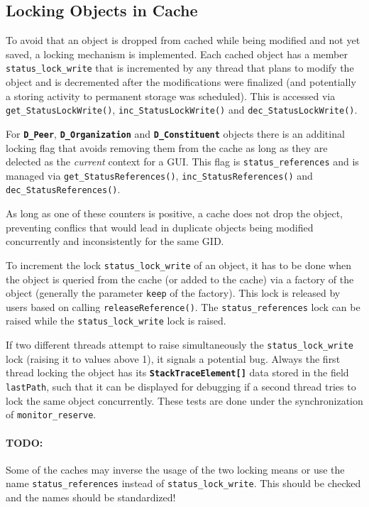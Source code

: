 \documentclass{book}
\newcommand{\cls}[1]{{\tt\bf #1}}
\newcommand{\mth}[1]{{\tt #1}}
\newcommand{\mmb}[1]{{\tt #1}}
\begin{document}
\subsection{Locking Objects in Cache}

To avoid that an object is dropped from cached while being modified and not yet saved, a locking mechanism is implemented.
Each cached object has a member \mmb{status\_lock\_write} that is incremented by any thread that plans to modify the object
and is decremented after the modifications were finalized (and potentially a storing activity to permanent storage was scheduled).
This is accessed via  \mth{get\_StatusLockWrite()}, \mth{inc\_StatusLockWrite()} and \mth{dec\_StatusLockWrite()}.

For \cls{D\_Peer}, \cls{D\_Organization} and \cls{D\_Constituent} objects there is an additinal locking flag that avoids removing them
from the cache as long as they are delected as the {\em current} context for a GUI. This flag is \mmb{status\_references}
and is managed via \mth{get\_StatusReferences()}, \mth{inc\_StatusReferences()} and \mth{dec\_StatusReferences()}.

As long as one of these counters is positive, a cache does not drop the object, preventing conflics that would lead in duplicate
objects being modified concurrently and inconsistently for the same GID.

To increment the lock \mmb{status\_lock\_write} of an object, it has to be done when the object is queried from the cache (or added to the cache) via a factory of the object (generally the parameter \mmb{keep} of the factory). This lock is released by users based on calling \mmb{releaseReference()}. The \mmb{status\_references} lock can be raised while the
\mmb{status\_lock\_write} lock is raised.

If two different threads attempt to raise simultaneously the \mmb{status\_lock\_write} lock (raising it to values above 1),
it signals a potential bug. Always the first thread locking the object has its \cls{StackTraceElement[]} data stored in the field \mmb{lastPath},
such that it can be displayed for debugging if a second thread tries to lock the same object concurrently.
These tests are done under the synchronization of \mmb{monitor\_reserve}.

\paragraph{TODO:} Some of the caches may inverse the usage of the two locking means or use the name \mmb{status\_references} 
instead of \mmb{status\_lock\_write}. This should be checked and the names should be standardized!
\end{document}
